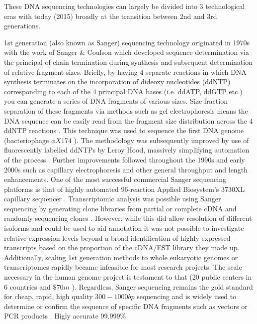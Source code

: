 These DNA sequencing technologies can largely be divided into 3 technological eras with today (2015) 
broadly at the transition between 2nd and 3rd generations.


1st generation (also known as Sanger) sequencing technology originated in 1970s with the work of Sanger \&
Coulson \citep{Sanger1975,Sanger1977,Sanger1977a} which 
developed sequence determination via the principal of chain termination during 
synthesis and subsequent determination of relative fragment sizes. 
Briefly, by having 4 separate reactions in which DNA synthesis terminates on the incorporation
of dideoxy nucleotides (ddNTP) corresponding to each of the 4 principal DNA bases (i.e. ddATP, ddGTP etc.) 
you can generate a series of DNA fragments of various sizes.  Size fraction separation of these fragments 
via methods such as gel electrophoresis means the DNA sequence can be easily read from the fragment size distribution
across the 4 ddNTP reactions \citep{Sanger1977a}. 
This technique was used to sequence the first DNA genome (bacteriophage \(\phi X174\) \citep{Sanger1977}).
The methodology was subsequently improved by use of fluorescently labelled ddNTPs by Leroy Hood,
massively simplifying automation of the process \citep{Smith1985,Smith1986}.
Further improvements followed throughout the 1990s and early 2000s such as capillary electrophoresis
and other general throughput and length enhancements.  One of the most successful commercial 
Sanger sequencing platforms is that of highly automated 96-reaction Applied Biosystem's 3730XL capillary sequencer \citep{Bonetta2006}.
Transcriptomic analysis was possible using Sanger sequencing by generating clone libraries from partial or complete cDNA and randomly sequencing
clones \citep{Adams1991,Gerhard2004}.  However, while this did allow resolution of different isoforms and could be used to aid annotation \citep{Adams1991}
it was not possible to investigate relative expression levels beyond a broad identification of highly expressed transcripts based on the 
proportion of the cDNA/EST library they made up.
Additionally, scaling 1st generation methods to whole eukaryotic genomes or transcriptomes 
rapidly became infeasible for most research projects. The scale necessary in the human genome project \citep{Lander2001,Venter2001} is testament to that 
(20 public centers in 6 countries \citep{Collins2003} and \(\$70m\) \citep{Pettersson2009}).  
Regardless, Sanger sequencing remains the gold standard for cheap, rapid, high quality \(300-1000bp\) sequencing and 
is widely used to determine or confirm the sequence of specific DNA fragments such as vectors or PCR products \citep{Bonetta2006,Tsiatis2010}.  
Higly accurate 99.999\% 



